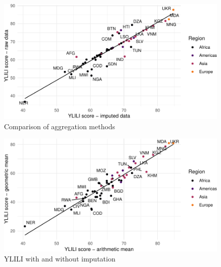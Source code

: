 \documentclass[
  a4paper, twoside, 12pt]{book}
\begin{document}

\begin{figure}[H]

{\centering \includegraphics{figures/fig-arithgeom-1} 

}

\caption{Comparison of aggregation methods}\label{fig:fig-arithgeom}
\end{figure}

\begin{figure}[H]

{\centering \includegraphics{figures/fig-imputedraw-1} 

}

\caption{YLILI with and without imputation}\label{fig:fig-imputedraw}
\end{figure}

\begin{landscape}



\end{landscape}

\renewcommand{\thesection}{\arabic{chapter}.\arabic{section}}
\setcounter{section}{0}
\renewcommand{\thesubsection}{\arabic{chapter}.\arabic{section}.\arabic{subsection}}
\setcounter{subsection}{0}
\end{document}
